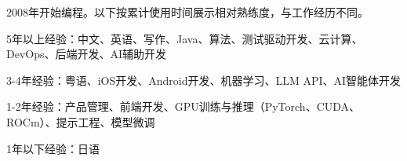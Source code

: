 
\begin{cvskills}

  \cventry
    {} %
    {} %
    {} %
    {} %
    {
      \begin{cvitems}
            \item {2008年开始编程。以下按累计使用时间展示相对熟练度，与工作经历不同。}
            \item {5年以上经验：中文、英语、写作、Java、算法、测试驱动开发、云计算、DevOps、后端开发、AI辅助开发}
            \item {3-4年经验：粤语、iOS开发、Android开发、机器学习、LLM API、AI智能体开发}
            \item {1-2年经验：产品管理、前端开发、GPU训练与推理（PyTorch、CUDA、ROCm）、提示工程、模型微调}
            \item {1年以下经验：日语}
      \end{cvitems}
    }

\end{cvskills}
